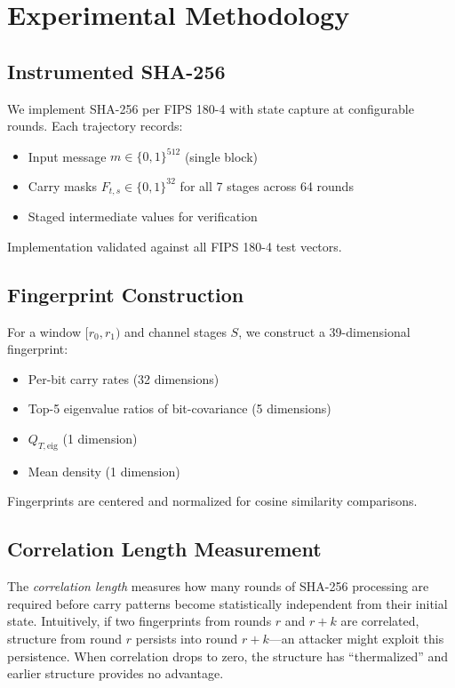 \documentclass[11pt,a4paper]{article}
\theoremstyle{plain}
\theoremstyle{definition}
\theoremstyle{remark}
\newcommand{\Qteig}{Q_{T,\mathrm{eig}}}
\begin{document}
\section{Experimental Methodology}

\subsection{Instrumented SHA-256}

We implement SHA-256 per FIPS 180-4 with state capture at configurable rounds. Each trajectory records:
\begin{itemize}
    \item Input message $m \in \{0,1\}^{512}$ (single block)
    \item Carry masks $F_{t,s} \in \{0,1\}^{32}$ for all 7 stages across 64 rounds
    \item Staged intermediate values for verification
\end{itemize}

Implementation validated against all FIPS 180-4 test vectors.

\subsection{Fingerprint Construction}

For a window $[r_0, r_1)$ and channel stages $S$, we construct a 39-dimensional fingerprint:
\begin{itemize}
    \item Per-bit carry rates (32 dimensions)
    \item Top-5 eigenvalue ratios of bit-covariance (5 dimensions)
    \item $\Qteig$ (1 dimension)
    \item Mean density (1 dimension)
\end{itemize}

Fingerprints are centered and normalized for cosine similarity comparisons.

\subsection{Correlation Length Measurement}

The \emph{correlation length} measures how many rounds of SHA-256 processing are required before carry patterns become statistically independent from their initial state. Intuitively, if two fingerprints from rounds $r$ and $r+k$ are correlated, structure from round $r$ persists into round $r+k$---an attacker might exploit this persistence. When correlation drops to zero, the structure has ``thermalized'' and earlier structure provides no advantage.
\end{document}
